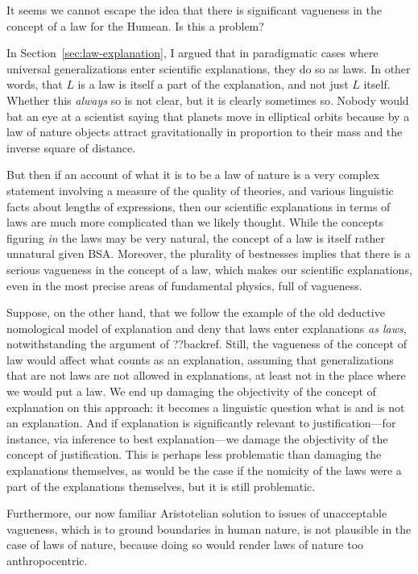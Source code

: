 It seems we cannot escape the idea that there is significant vagueness in the concept of a law for the Humean.
Is this a problem?

In Section~\ref{sec:law-explanation}, I argued that in paradigmatic cases where universal generalizations enter scientific 
explanations, they do so as laws. In other words, that $L$ is a law is itself a part of the explanation, and not just $L$ itself. 
Whether this \textit{always} so is not clear, but it is clearly sometimes so. Nobody would bat an eye 
at a scientist saying that planets move in elliptical orbits because
by a law of nature objects attract gravitationally in proportion to their mass and the inverse square of distance.

But then if an account of what it is to be a law of nature is a very complex statement involving a measure
of the quality of theories, and various linguistic facts about lengths of expressions, then our scientific explanations in 
terms of laws are much more complicated than we likely thought. While the concepts figuring \textit{in} the laws may be very
natural, the concept of a law is itself rather unnatural given BSA. Moreover, the plurality of bestnesses implies that there is a serious
vagueness in the concept of a law, which makes our scientific explanations, even in the most precise areas of fundamental physics,
full of vagueness. 

Suppose, on the other hand, that we follow the example of the old deductive nomological model of explanation and deny that laws 
enter explanations \textit{as laws}, notwithstanding the argument of ??backref. Still, the vagueness of the concept of law would affect what counts as an explanation, assuming that generalizations that
are not laws are not allowed in explanations, at least not in the place where we would put a law. We end up damaging the
objectivity of the concept of explanation on this approach: it becomes a linguistic question what is and is not an explanation. 
And if explanation is significantly relevant to justification---for instance, via inference to best explanation---we damage the 
objectivity of the concept of justification. This is perhaps less problematic than damaging the explanations themselves, as would
be the case if the nomicity of the laws were a part of the explanations themselves, but it is still problematic.

Furthermore, our now familiar Aristotelian solution to issues of unacceptable vagueness, which is to ground boundaries in human nature,
is not plausible in the case of laws of nature, because doing so would render laws of nature too anthropocentric. 

